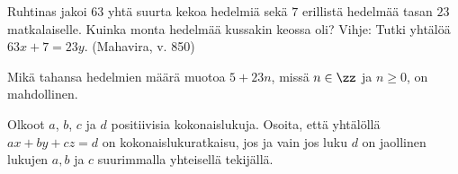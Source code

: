 \begin{tehtavasivu}
\begin{tehtava}
\end{tehtava}

\begin{tehtava}
    Ruhtinas jakoi $63$ yhtä suurta kekoa hedelmiä sekä $7$ erillistä hedelmää tasan $23$ matkalaiselle. Kuinka monta hedelmää kussakin keossa oli? Vihje: Tutki yhtälöä $63x + 7 = 23y$. (Mahavira, v. 850)
    
    \begin{vastaus}
        Mikä tahansa hedelmien määrä muotoa $5 + 23n$, missä $n\in\zz$ ja $n\geq 0$, on mahdollinen.
    \end{vastaus}
    
\end{tehtava}

\begin{tehtava}
    Olkoot $a$, $b$, $c$ ja $d$ positiivisia kokonaislukuja. Osoita, että yhtälöllä $ax+by+cz=d$ on kokonaislukuratkaisu, jos ja vain jos luku $d$ on jaollinen lukujen $a, b$ ja $c$ suurimmalla yhteisellä tekijällä.
\end{tehtava}

\end{tehtavasivu}
